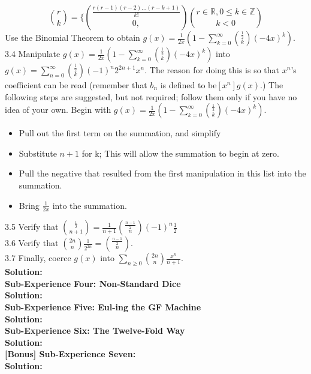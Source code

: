 \documentclass[10pt,a4paper]{report}
\begin{document}
	\[\binom{r}{k} = \lbrace \binom{\frac{r(r-1)(r-2)...(r-k+1)}{k!}}{0,}\binom{r\in\mathbb{R},0\leq k\in\mathbb{Z}}{k<0}\]
	Use the Binomial Theorem to obtain $g(x) = \frac{1}{2x}(1-\sum_{k=0}^{\infty}\binom{\frac{1}{2}}{k}(-4x)^k)$.\\
	3.4 Manipulate $g(x) = \frac{1}{2x}(1-\sum_{k=0}^{\infty}\binom{\frac{1}{2}}{k}(-4x)^k)$ into $g(x) = \sum_{n=0}^{\infty}\binom{\frac{1}{2}}{k}(-1)^n2^{2n+1}x^n$.  The reason for doing this is so that $x^n$'s coefficient can be read (remember that $b_n$ is defined to be$ [x^n]g(x)$.)  The following steps are suggested, but not required; follow them only if you have no idea of your own.  Begin with $g(x) = \frac{1}{2x}(1-\sum_{k=0}^{\infty}\binom{\frac{1}{2}}{k}(-4x)^k)$.\\
	\begin{itemize}
		\item Pull out the first term on the summation,  and simplify
		\item Substitute $n+1$ for k;  This will allow the summation to begin at zero.
		\item Pull the negative that resulted from the first manipulation in this list into the summation. 
		\item Bring $\frac{1}{2x}$ into the summation.
	\end{itemize}
	
	3.5 Verify that $\binom{\frac{1}{2}}{n+1} = \frac{1}{n+1}\binom{\frac{n-1}{2}}{n}(-1)^n\frac{1}{2}$\\
	3.6 Verify that $\binom{2n}{n}\frac{1}{2^{2n}} = \binom{\frac{n-1}{2}}{n}$.\\
	3.7 Finally, coerce $g(x)$ into $\sum_{n\geq0}^{}\binom{2n}{n}\frac{x^n}{n+1}$.\\
	\textbf{Solution: }\\
	\newline
	\textbf{Sub-Experience Four: Non-Standard Dice}\\
	\textbf{Solution: }\\
	\newline
	\textbf{Sub-Experience Five: Eul-ing the GF Machine}\\
	\textbf{Solution: }\\
	\newline
	\textbf{Sub-Experience Six: The Twelve-Fold Way}\\
	\textbf{Solution: }\\
	\newline
	\textbf{[Bonus] Sub-Experience Seven:}\\	
	\textbf{Solution: }\\
	\newline
\end{document}
